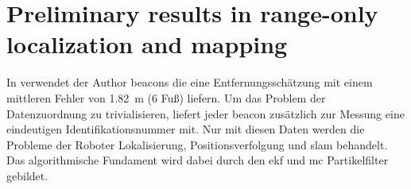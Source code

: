 %
%
\section{Preliminary results in range-only localization and mapping}

In \cite{kantor2002preliminary} verwendet der Author \Glspl{beacon} die eine Entfernungsschätzung mit einem mittleren Fehler von \SI{1.82}{\metre} (6 Fuß) liefern. Um das Problem der Datenzuordnung zu trivialisieren, liefert jeder \Gls{beacon} zusätzlich zur Messung eine eindeutigen Identifikationsnummer mit. Nur mit diesen Daten werden die Probleme der Roboter Lokalisierung, Positionsverfolgung und \Gls{slam} behandelt. Das algorithmische Fundament wird dabei durch den \Gls{ekf} und \Gls{mc} Partikelfilter gebildet.

